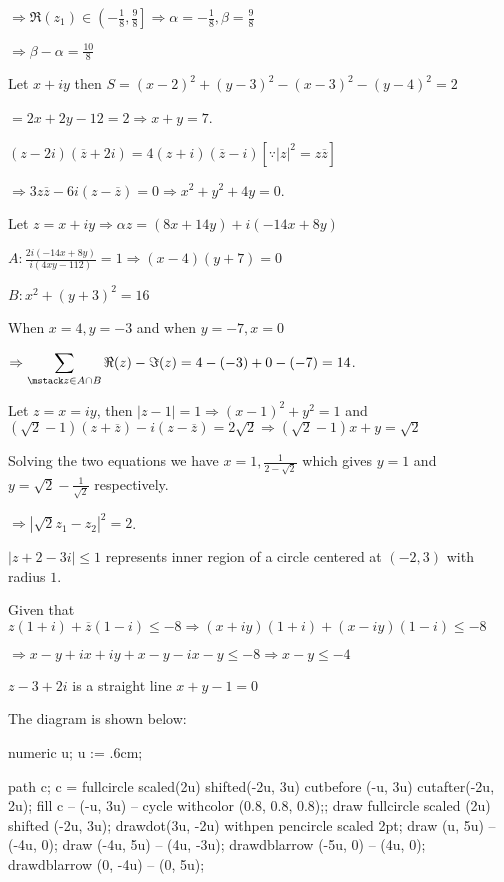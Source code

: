   $\Rightarrow \Re(z_1)\in \left(-\frac{1}{8}, \frac{9}{8}\right]\Rightarrow \alpha =
  -\frac{1}{8}, \beta = \frac{9}{8}$

  $\Rightarrow \beta  - \alpha = \frac{10}{8}$
\item Let $x + iy$ then $S = (x -  2)^2 + (y - 3)^2 - (x - 3)^2 - (y - 4)^2 = 2$

  $= 2x + 2y -12 = 2\Rightarrow x + y = 7$.
\item $(z - 2i)(\overline{z} + 2i) = 4(z + i)(\overline{z} - i)[\because |z|^2 = z\overline{z}]$

  $\Rightarrow 3z\overline{z} - 6i(z - \overline{z}) = 0 \Rightarrow x^2 + y^2 + 4y = 0$.
\item Let $z = x + iy\Rightarrow \alpha z = (8x + 14y) + i(-14x + 8y)$

  $A: \frac{2i(-14x + 8y)}{i(4xy -112)}= 1\Rightarrow (x - 4)(y + 7) = 0$

  $B: x^2 + (y + 3)^2 = 16$

  When $x = 4, y = -3$ and when $y = -7, x = 0$

  $\Rightarrow \displaystyle\sum_{\mstack z\in A\cap B} \Re(z) - \Im(z) = 4 - (-3) + 0 - (-7) = 14$.
\item Let $z = x = iy$, then $|z - 1| = 1\Rightarrow (x - 1)^2 + y^2 = 1$ and $(\sqrt{2} - 1)(z
  + \overline{z}) - i(z - \overline{z}) = 2\sqrt{2} \Rightarrow (\sqrt{2} - 1)x + y = \sqrt{2}$

  Solving the two equations we have $x = 1, \frac{1}{2 - \sqrt{2}}$ which gives $y = 1$ and $y = \sqrt{2}
  - \frac{1}{\sqrt{2}}$ respectively.

  $\Rightarrow |\sqrt{2}z_1 - z_2|^2 = 2$.
\item $|z + 2 - 3i|\leq 1$ represents inner region of a circle centered at $(-2, 3)$ with radius $1$.

  Given that $z(1 + i) + \overline{z}(1 - i)\leq -8\Rightarrow (x + iy)(1 + i) + (x - iy)(1 - i)\leq -8$

  $\Rightarrow x - y + ix + iy + x - y -ix -y \leq -8 \Rightarrow x - y \leq -4$

  $z - 3 + 2i$ is a straight line $x + y - 1 = 0$

  The diagram is shown below:

  \startplacefigure[location=force]
    \startMPcode
      numeric u;
      u := .6cm;

      path c;
      c = fullcircle scaled(2u) shifted(-2u, 3u) cutbefore (-u, 3u) cutafter(-2u, 2u);
      fill c -- (-u, 3u) -- cycle withcolor (0.8, 0.8, 0.8);;
      draw fullcircle scaled (2u) shifted (-2u, 3u);
      drawdot(3u, -2u) withpen pencircle scaled 2pt;
      draw (u, 5u) -- (-4u, 0);
      draw (-4u, 5u) -- (4u, -3u);
      drawdblarrow (-5u, 0) -- (4u, 0);
      drawdblarrow (0, -4u) -- (0, 5u);

